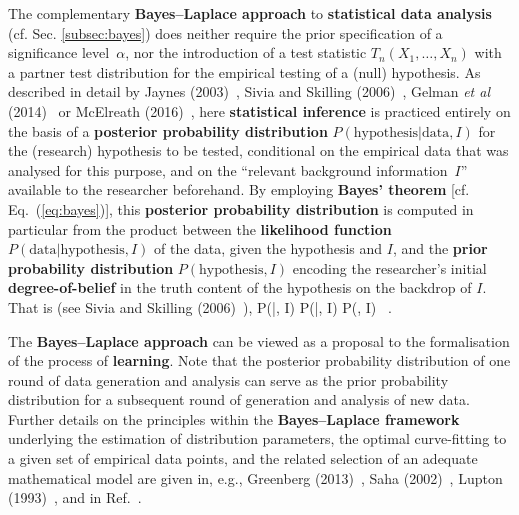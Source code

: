 \medskip
\noindent
The complementary \textbf{Bayes--Laplace approach} to 
\textbf{statistical data analysis} (cf. Sec. \ref{subsec:bayes}) 
does neither require the prior specification of a significance 
level~$\alpha$, nor the introduction of a test statistic 
$T_{n}(X_{1}, \ldots, X_{n})$ with a partner test distribution for
the empirical testing of a (null) hypothesis. As described in
detail by Jaynes (2003)~, Sivia and Skilling 
(2006)~, Gelman \textit{et al}
(2014)~ or McElreath (2016)~, here
\textbf{statistical inference} is practiced entirely on the basis
of a \textbf{posterior probability distribution}
$P(\text{hypothesis}|\text{data}, I)$ for
the (research) hypothesis to be tested, conditional on the
empirical data that was analysed for this purpose, and on the
``relevant background information~$I$'' available to the researcher 
beforehand. By employing \textbf{Bayes' theorem} [cf. 
Eq.~(\ref{eq:bayes})], this \textbf{posterior probability 
distribution} is computed in particular from the product between 
the \textbf{likelihood function} $P(\text{data}|\text{hypothesis}, 
I)$ of the data, given the hypothesis and $I$, and the
\textbf{prior probability distribution} $P(\text{hypothesis}, I)$ 
encoding the researcher's initial \textbf{degree-of-belief} in the 
truth content of the hypothesis on the backdrop of $I$. That is 
(see Sivia and Skilling (2006)~),
%
\be
P(|, I) \propto 
P(|, I) \times P(, I) 
\ .
\ee
%

\medskip
\noindent
The \textbf{Bayes--Laplace approach} can be viewed as a proposal to 
the formalisation of the process of \textbf{learning}. Note that
the posterior probability distribution of one round of data
generation and analysis can serve as the prior probability
distribution for a subsequent round of generation and analysis of
new data. Further details on the principles within the
\textbf{Bayes--Laplace framework} underlying the estimation of
distribution parameters, the optimal curve-fitting to a given set
of empirical data points, and the related selection of an adequate mathematical model are given in, e.g., Greenberg
(2013)~, Saha (2002)~,
Lupton (1993)~, and in Ref.~.

